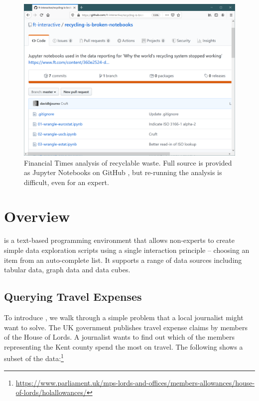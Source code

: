 \documentclass[manuscript,review,anonymous]{acmart}
\begin{document}
\begin{figure}
\includegraphics[width=1\columnwidth]{figures/ft}
\caption{Financial Times analysis of recyclable waste. Full source is provided as Jupyter Notebooks
on GitHub \cite{ftnotebooks}, but re-running the analysis is difficult, even for an expert.}
\label{fig:ft}
\end{figure}


\section{Overview}
\label{sec:overview}

\tg is a text-based programming environment that allows non-experts to create simple data exploration
scripts using a single interaction principle -- choosing an item from an auto-complete list.
It supports a range of data sources including tabular data, graph data and data cubes.

\subsection{Querying Travel Expenses}
To introduce \tg, we walk through a simple problem that a local journalist might want to solve.
The UK government publishes travel expense claims by members of the House of Lords. A journalist
wants to find out which of the members representing the Kent county spend the most on travel.
The following shows a subset of the data:\footnote{ \url{https://www.parliament.uk/mps-lords-and-offices/members-allowances/house-of-lords/holallowances/} }
\end{document}
